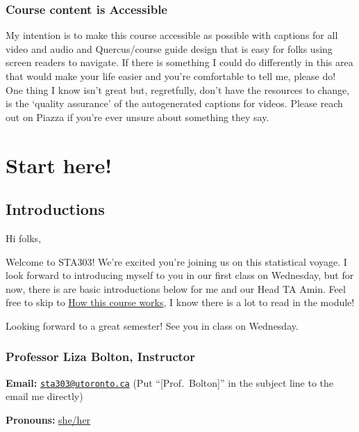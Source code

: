 \documentclass[
  openany]{book}
\begin{document}
\hypertarget{course-content-is-accessible}{%
\subsection{Course content is Accessible}\label{course-content-is-accessible}}

My intention is to make this course accessible as possible with captions for all video and audio and Quercus/course guide design that is easy for folks using screen readers to navigate. If there is something I could do differently in this area that would make your life easier and you're comfortable to tell me, please do! One thing I know isn't great but, regretfully, don't have the resources to change, is the `quality assurance' of the autogenerated captions for videos. Please reach out on Piazza if you're ever unsure about something they say.

\hypertarget{start-here}{%
\chapter{Start here!}\label{start-here}}

\hypertarget{introductions}{%
\section{Introductions}\label{introductions}}

Hi folks,

Welcome to STA303! We're excited you're joining us on this statistical voyage. I look forward to introducing myself to you in our first class on Wednesday, but for now, there is are basic introductions below for me and our Head TA Amin. Feel free to skip to \protect\hyperlink{howthiscourseworks}{How this course works}, I know there is a lot to read in the module!

Looking forward to a great semester! See you in class on Wednesday.

\hypertarget{professor-liza-bolton-instructor}{%
\subsection{Professor Liza Bolton, Instructor}\label{professor-liza-bolton-instructor}}

\textbf{Email:} \href{mailto:sta303@utoronto.ca}{\nolinkurl{sta303@utoronto.ca}} (Put ``{[}Prof.~Bolton{]}'' in the subject line to the email me directly)

\textbf{Pronouns:} \href{https://www.mypronouns.org/she-her}{she/her}
\end{document}
